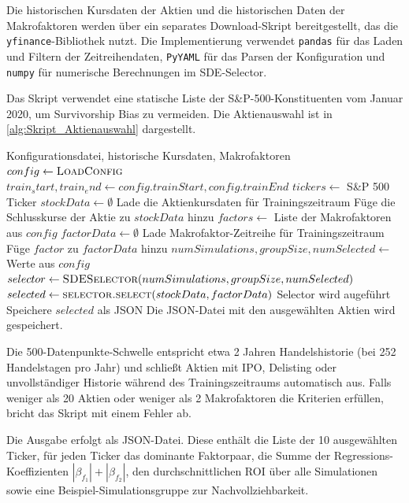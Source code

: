 Die historischen Kursdaten der Aktien und die historischen Daten der Makrofaktoren werden über ein separates Download-Skript bereitgestellt, das die \texttt{yfinance}-Bibliothek nutzt. Die Implementierung verwendet \texttt{pandas} für das Laden und Filtern der Zeitreihendaten, \texttt{PyYAML} für das Parsen der Konfiguration und \texttt{numpy} für numerische Berechnungen im SDE-Selector.

Das Skript verwendet eine statische Liste der S\&P-500-Konstituenten vom Januar 2020, um Survivorship Bias zu vermeiden. Die Aktienauswahl ist in \cref{alg:Skript_Aktienauswahl} dargestellt.
\begin{algorithm}
    \caption{Skript Aktienauswahl}\label{alg:Skript_Aktienauswahl}
    \small
    \begin{algorithmic}[1]
        \Require Konfigurationsdatei, historische Kursdaten, Makrofaktoren
        \State $config \gets \Call{LoadConfig}{}$
        \State $train_start, train_end \gets config.trainStart, config.trainEnd$
        \State $tickers \gets$ S\&P 500 Ticker
        \State $stockData \gets \emptyset$
        \State Lade die Aktienkursdaten für Trainingszeitraum
        \State Füge die Schlusskurse der Aktie zu $stockData$ hinzu
        \EndIf
        \EndFor
        \State $factors \gets$ Liste der Makrofaktoren aus $config$
        \State $factorData \gets \emptyset$
        \State Lade Makrofaktor-Zeitreihe für Trainingszeitraum
        \State Füge $factor$ zu $factorData$ hinzu
        \EndIf
        \EndFor
        \State $numSimulations, groupSize, numSelected \gets$ Werte aus $config$
        \State $selector \gets \Call{SDESelector}{numSimulations, groupSize, numSelected}$
        \State $selected \gets \Call{selector.select}{stockData, factorData}$ Selector wird augeführt
        \State Speichere $selected$ als JSON
        \State Die JSON-Datei mit den ausgewählten Aktien wird gespeichert.
    \end{algorithmic}
\end{algorithm}
Die 500-Datenpunkte-Schwelle entspricht etwa 2 Jahren Handelshistorie (bei 252 Handelstagen pro Jahr) und schließt Aktien mit IPO, Delisting oder unvollständiger Historie während des Trainingszeitraums automatisch aus. Falls weniger als 20 Aktien oder weniger als 2 Makrofaktoren die Kriterien erfüllen, bricht das Skript mit einem Fehler ab.

Die Ausgabe erfolgt als JSON-Datei. Diese enthält die Liste der 10 ausgewählten Ticker, für jeden Ticker das dominante Faktorpaar, die Summe der Regressions-Koeffizienten $|\beta_{f_1}| + |\beta_{f_2}|$, den durchschnittlichen \ac{ROI} über alle Simulationen sowie eine Beispiel-Simulationsgruppe zur Nachvollziehbarkeit.

